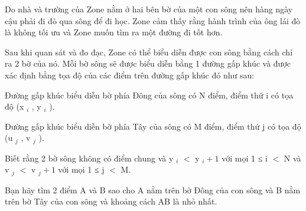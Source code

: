 Do nhà và trường của Zone nằm ở hai bên bờ của một con sông nên hàng ngày cậu phải đi đò qua sông để đi học. Zone cảm thấy rằng hành trình của ông lái đò là không tối ưu và Zone muốn tìm ra một đường đi tốt hơn.  

   Sau khi quan sát và đo đạc, Zone có thể biểu diễn được con sông bằng cách chỉ ra 2 bờ của nó. Mỗi bờ sông sẽ được biểu diễn bằng 1 đường gấp khúc và được xác định bằng tọa độ của các điểm trên đường gấp khúc đó như sau:  

   Đường gấp khúc biểu diễn bờ phía Đông của sông có N điểm, điểm thứ i có tọa độ (x   $_    i   $   , y   $_    i   $   ).  

   Đường gấp khúc biểu diễn bờ phía Tây của sông có M điểm, điểm thứ j có tọa độ (u   $_    j   $   , v   $_    j   $   ).  

   Biết rằng 2 bờ sông không có điểm chung và y   $_    i   $   $<$ y   $_    i+1   $   với mọi 1 ≤ i $<$ N và v   $_    j   $   $<$ v   $_    j+1   $   với mọi 1 ≤ j $<$ M.  

   Bạn hãy tìm 2 điểm A và B sao cho A nằm trên bờ Đông của con sông và B nằm trên bờ Tây của con sông và khoảng cách AB là nhỏ nhất.